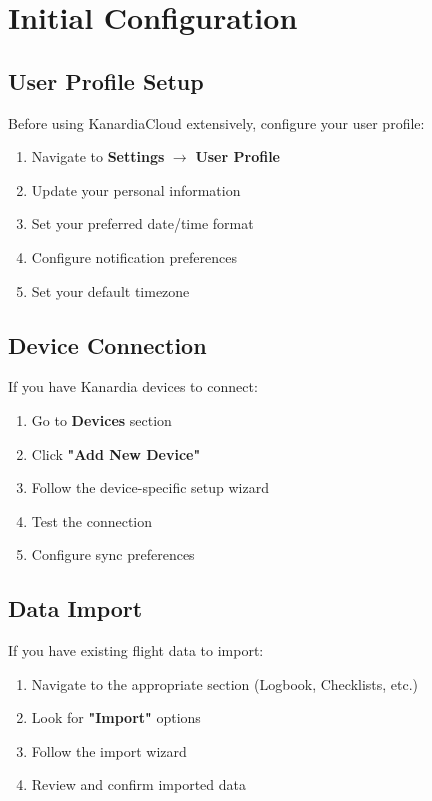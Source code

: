 \section{Initial Configuration}

\subsection{User Profile Setup}

Before using KanardiaCloud extensively, configure your user profile:

\begin{enumerate}
    \item Navigate to \textbf{Settings} $\rightarrow$ \textbf{User Profile}
    \item Update your personal information
    \item Set your preferred date/time format
    \item Configure notification preferences
    \item Set your default timezone
\end{enumerate}

\subsection{Device Connection}

If you have Kanardia devices to connect:

\begin{enumerate}
    \item Go to \textbf{Devices} section
    \item Click \textbf{"Add New Device"}
    \item Follow the device-specific setup wizard
    \item Test the connection
    \item Configure sync preferences
\end{enumerate}

\subsection{Data Import}

If you have existing flight data to import:

\begin{enumerate}
    \item Navigate to the appropriate section (Logbook, Checklists, etc.)
    \item Look for \textbf{"Import"} options
    \item Follow the import wizard
    \item Review and confirm imported data
\end{enumerate}
